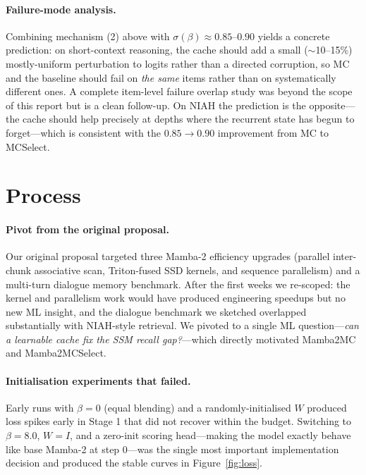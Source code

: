 \documentclass{article}
\begin{document}
\paragraph{Failure-mode analysis.} Combining mechanism (2) above with $\sigma(\beta)\!\approx\!0.85$--$0.90$ yields a concrete prediction: on short-context reasoning, the cache should add a small ($\sim$10--15\%) mostly-uniform perturbation to logits rather than a directed corruption, so MC and the baseline should fail on \emph{the same} items rather than on systematically different ones. A complete item-level failure overlap study was beyond the scope of this report but is a clean follow-up. On NIAH the prediction is the opposite---the cache should help precisely at depths where the recurrent state has begun to forget---which is consistent with the $0.85\!\to\!0.90$ improvement from MC to MCSelect.

\section{Process}
\label{sec:process}

\paragraph{Pivot from the original proposal.} Our original proposal targeted three Mamba-2 efficiency upgrades (parallel inter-chunk associative scan, Triton-fused SSD kernels, and sequence parallelism) and a multi-turn dialogue memory benchmark. After the first weeks we re-scoped: the kernel and parallelism work would have produced engineering speedups but no new ML insight, and the dialogue benchmark we sketched overlapped substantially with NIAH-style retrieval. We pivoted to a single ML question---\emph{can a learnable cache fix the SSM recall gap?}---which directly motivated Mamba2MC and Mamba2MCSelect.

\paragraph{Initialisation experiments that failed.} Early runs with $\beta=0$ (equal blending) and a randomly-initialised $W$ produced loss spikes early in Stage 1 that did not recover within the budget. Switching to $\beta=8.0$, $W=I$, and a zero-init scoring head---making the model exactly behave like base Mamba-2 at step 0---was the single most important implementation decision and produced the stable curves in Figure~\ref{fig:loss}.
\end{document}
